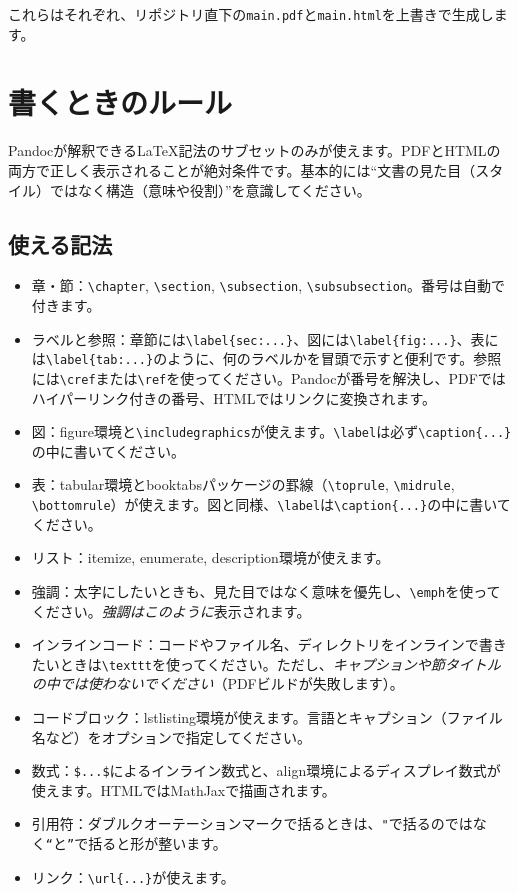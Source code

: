 これらはそれぞれ、リポジトリ直下の\texttt{main.pdf}と\texttt{main.html}を上書きで生成します。

\section{書くときのルール}
\label{sec:writing_rules}
Pandocが解釈できるLaTeX記法のサブセットのみが使えます。PDFとHTMLの両方で正しく表示されることが絶対条件です。基本的には``文書の見た目（スタイル）ではなく構造（意味や役割）''を意識してください。

\subsection{使える記法}
\begin{itemize}
    \item 章・節：\texttt{\textbackslash chapter}, \texttt{\textbackslash section}, \texttt{\textbackslash subsection}, \texttt{\textbackslash subsubsection}。番号は自動で付きます。
    \item ラベルと参照：章節には\texttt{\textbackslash label\{sec:...\}}、図には\texttt{\textbackslash label\{fig:...\}}、表には\texttt{\textbackslash label\{tab:...\}}のように、何のラベルかを冒頭で示すと便利です。参照には\texttt{\textbackslash cref}または\texttt{\textbackslash ref}を使ってください。Pandocが番号を解決し、PDFではハイパーリンク付きの番号、HTMLではリンクに変換されます。
    \item 図：figure環境と\texttt{\textbackslash includegraphics}が使えます。\texttt{\textbackslash label}は必ず\texttt{\textbackslash caption\{...\}}の中に書いてください。
    \item 表：tabular環境とbooktabsパッケージの罫線（\texttt{\textbackslash toprule}, \texttt{\textbackslash midrule}, \texttt{\textbackslash bottomrule}）が使えます。図と同様、\texttt{\textbackslash label}は\texttt{\textbackslash caption\{...\}}の中に書いてください。
    \item リスト：itemize, enumerate, description環境が使えます。
    \item 強調：太字にしたいときも、見た目ではなく意味を優先し、\texttt{\textbackslash emph}を使ってください。\emph{強調はこのように}表示されます。
    \item インラインコード：コードやファイル名、ディレクトリをインラインで書きたいときは\texttt{\textbackslash texttt}を使ってください。ただし、\emph{キャプションや節タイトルの中では使わないでください}（PDFビルドが失敗します）。
    \item コードブロック：lstlisting環境が使えます。言語とキャプション（ファイル名など）をオプションで指定してください。
    \item 数式：\texttt{\$...\$}によるインライン数式と、align環境によるディスプレイ数式が使えます。HTMLではMathJaxで描画されます。
    \item 引用符：ダブルクオーテーションマークで括るときは、\texttt{"}で括るのではなく\texttt{``}と\texttt{''}で括ると形が整います。
    \item リンク：\texttt{\textbackslash url\{...\}}が使えます。
\end{itemize}

